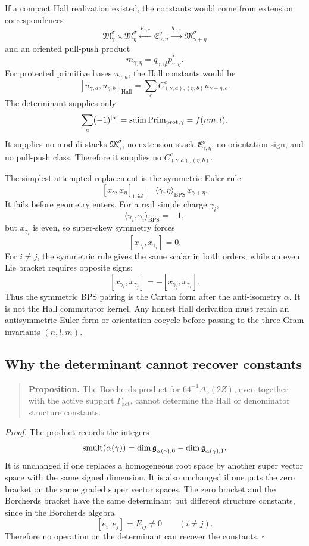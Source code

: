 If a compact Hall realization existed, the constants would come from
extension correspondences
$$
\mathfrak M_\gamma^\sigma\times\mathfrak M_\eta^\sigma
\xleftarrow{\ p_{\gamma,\eta}\ }
\mathfrak E_{\gamma,\eta}^\sigma
\xrightarrow{\ q_{\gamma,\eta}\ }
\mathfrak M_{\gamma+\eta}^\sigma
$$
and an oriented pull-push product
$$
m_{\gamma,\eta}
=q_{\gamma,\eta!}p_{\gamma,\eta}^{*}.
$$
For protected primitive bases \(u_{\gamma,a}\), the Hall constants would
be
$$
[u_{\gamma,a},u_{\eta,b}]_{\mathrm{Hall}}
=
\sum_c C^c_{(\gamma,a),(\eta,b)}u_{\gamma+\eta,c}.
$$
The determinant supplies only
$$
\sum_a(-1)^{|a|}
=
\operatorname{sdim}\operatorname{Prim}_{\mathrm{prot},\gamma}
=f(nm,l).
$$
It supplies no moduli stacks \(\mathfrak M_\gamma^\sigma\), no extension
stack \(\mathfrak E_{\gamma,\eta}^\sigma\), no orientation sign, and no
pull-push class.  Therefore it supplies no \(C^c_{(\gamma,a),(\eta,b)}\).

The simplest attempted replacement is the symmetric Euler rule
$$
[x_\gamma,x_\eta]_{\mathrm{trial}}
=\langle\gamma,\eta\rangle_{\mathrm{BPS}}\,x_{\gamma+\eta}.
$$
It fails before geometry enters.  For a real simple charge
\(\gamma_i\),
$$
\langle\gamma_i,\gamma_i\rangle_{\mathrm{BPS}}=-1,
$$
but \(x_{\gamma_i}\) is even, so super-skew symmetry forces
$$
[x_{\gamma_i},x_{\gamma_i}]=0.
$$
For \(i\neq j\), the symmetric rule gives the same scalar in both
orders, while an even Lie bracket requires opposite signs:
$$
[x_{\gamma_i},x_{\gamma_j}]
=-[x_{\gamma_j},x_{\gamma_i}].
$$
Thus the symmetric BPS pairing is the Cartan form after the
anti-isometry \(\alpha\).  It is not the Hall commutator kernel.  Any
honest Hall derivation must retain an antisymmetric Euler form or
orientation cocycle before passing to the three Gram invariants
\((n,l,m)\).

\subsection{Why the determinant cannot recover constants}

\begin{quote}
\textbf{Proposition.}
The Borcherds product for \(64^{-1}\Delta_5(2Z)\), even together with
the active support \(\Gamma_{\mathrm{act}}\), cannot determine the
Hall or denominator structure constants.
\end{quote}

\noindent
\textit{Proof.}
The product records the integers
$$
\operatorname{smult}(\alpha(\gamma))
=\dim\mathfrak g_{\alpha(\gamma),\overline0}
-\dim\mathfrak g_{\alpha(\gamma),\overline1}.
$$
It is unchanged if one replaces a homogeneous root space by another
super vector space with the same signed dimension.  It is also unchanged
if one puts the zero bracket on the same graded super vector spaces.
The zero bracket and the Borcherds bracket have the same determinant but
different structure constants, since in the Borcherds algebra
$$
[e_i,e_j]=E_{ij}\neq0\qquad(i\neq j).
$$
Therefore no operation on the determinant can recover the constants.
\(\square\)

